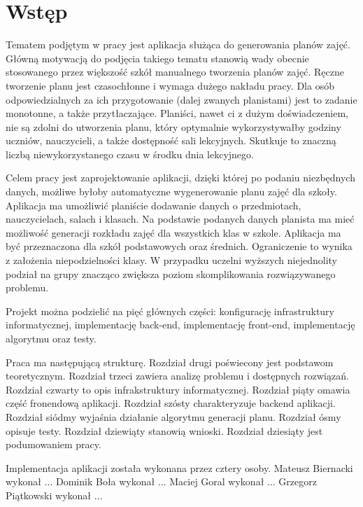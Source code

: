 
\chapter{Wstęp}
Tematem podjętym w pracy jest aplikacja służąca do generowania planów zajęć. Główną motywacją do podjęcia takiego tematu stanowią wady obecnie stosowanego przez większość szkół manualnego tworzenia planów zajęć. Ręczne tworzenie planu jest czasochłonne i wymaga dużego nakładu pracy. Dla osób odpowiedzialnych za ich przygotowanie (dalej zwanych planistami) jest to zadanie monotonne, a także przytłaczające. Planiści, nawet ci z dużym doświadczeniem, nie są zdolni do utworzenia planu, który optymalnie wykorzystywałby godziny uczniów, nauczycieli, a także dostępność sali lekcyjnych. Skutkuje to znaczną liczbą niewykorzystanego czasu w środku dnia lekcyjnego.

Celem pracy jest zaprojektowanie aplikacji, dzięki której po podaniu niezbędnych danych, możliwe byłoby automatyczne wygenerowanie planu zajęć dla szkoły. Aplikacja ma umożliwić planiście dodawanie danych o przedmiotach, nauczycielach, salach i klasach. Na podstawie podanych danych planista ma mieć możliwość generacji rozkładu zajęć dla wszystkich klas w szkole. Aplikacja ma być przeznaczona dla szkół podstawowych oraz średnich. Ograniczenie to wynika z założenia niepodzielności klasy. W przypadku uczelni wyższych niejednolity podział na grupy znacząco zwiększa poziom skomplikowania rozwiązywanego problemu. 

Projekt można podzielić na pięć głównych części: konfigurację infrastruktury informatycznej, implementację back-end, implementację front-end, implementację algorytmu oraz testy.

Praca ma następującą strukturę. Rozdział drugi poświecony jest podstawom teoretycznym. Rozdział trzeci zawiera analizę problemu i dostępnych rozwiązań. Rozdział czwarty to opis infrakstruktury informatycznej. Rozdział piąty omawia część fronendową aplikacji. Rozdział szósty charakteryzuje backend aplikacji. Rozdział siódmy wyjaśnia działanie algorytmu generacji planu. Rozdział ósmy opisuje testy. Rozdział dziewiąty stanowią wnioski. Rozdział dziesiąty jest podumowaniem pracy. 

Implementacja aplikacji została wykonana przez cztery osoby.
Mateusz Biernacki wykonał ...
Dominik Boła wykonał ...
Maciej Goral wykonał ...
Grzegorz Piątkowski wykonał ...
